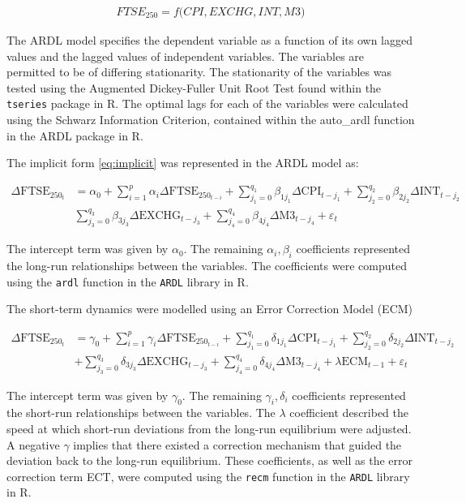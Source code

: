 \documentclass[11pt,a4paper]{article}
\begin{document}
\begin{align}
    FTSE_{250} = f\biggl(CPI, EXCHG, INT, M3\biggr) \label{eq:implicit}
\end{align}

The ARDL model specifies the dependent variable as a function of its own 
lagged values and the lagged values of independent variables. 
The variables are permitted to be of differing stationarity. The stationarity 
of the variables was tested using the Augmented Dickey-Fuller 
Unit Root Test found within the \texttt{tseries} package in R. The optimal lags for each of the 
variables were calculated using the Schwarz Information Criterion, contained
within the auto\_ardl function in the ARDL package in R. 

The implicit form \eqref{eq:implicit} was represented in the ARDL model as:

\begin{align*}
    \Delta \text{FTSE}_{250_t} &= \alpha_0 + \sum_{i=1}^{p} \alpha_i \Delta \text{FTSE}_{250_{t-i}} + \sum_{j_{1}=0}^{q_1} \beta_{1j_{1}} \Delta \text{CPI}_{t-j_{1}} + \sum_{j_{2}=0}^{q_2} \beta_{2j_{2}} \Delta \text{INT}_{t-j_{2}} \\
                               & \sum_{j_{3}=0}^{q_3} \beta_{3j_{3}} \Delta \text{EXCHG}_{t-j_{3}} + \sum_{j_{4}=0}^{q_4} \beta_{4j_{4}} \Delta \text{M3}_{t-j_{4}} + \varepsilon_t 
\end{align*}

The intercept term was given by $\alpha_0$. The 
remaining $\alpha_i, \beta_i$ coefficients represented the long-run relationships 
between the variables. The coefficients were computed using the \texttt{ardl} function in the 
\texttt{ARDL} library in R. 

The short-term dynamics were modelled using an Error Correction Model (ECM) 

\begin{align*}
    \Delta \text{FTSE}_{250_t} &= \gamma_0 + \sum_{i=1}^{p} \gamma_i \Delta \text{FTSE}_{250_{t-i}} + \sum_{j_{1}=0}^{q_1} \delta_{1j_{1}} \Delta \text{CPI}_{t-j_{1}} + \sum_{j_{2}=0}^{q_2} \delta_{2j_{2}} \Delta \text{INT}_{t-j_{2}} \\
                               & + \sum_{j_{3}=0}^{q_3} \delta_{3j_{3}} \Delta \text{EXCHG}_{t-j_{3}} + \sum_{j_{4}=0}^{q_4} \delta_{4j_{4}} \Delta \text{M3}_{t-j_{4}} + \lambda \text{ECM}_{t-1} + \varepsilon_t
\end{align*}
 
The intercept term was given by $\gamma_0$. The 
remaining $\gamma_i, \delta_i$ coefficients represented the short-run 
relationships between the variables. The $\lambda$ coefficient 
described the speed at which short-run deviations from the long-run equilibrium
were adjusted. A negative $\gamma$ implies that there existed a correction mechanism that guided the deviation 
back to the long-run equilibrium. These coefficients, as well 
as the error correction term ECT, were computed using the \texttt{recm} function in the 
\texttt{ARDL} library in R.
\end{document}
